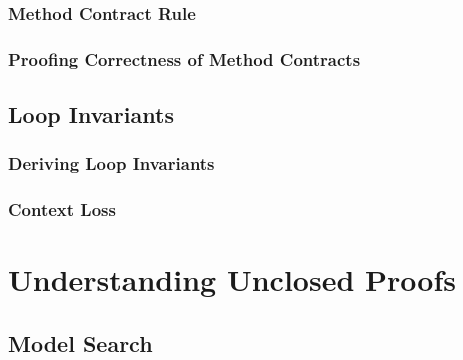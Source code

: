 \documentclass[a4paper, 11pt, accentcolor = tud3b]{tudreport}
\begin{document}
                \subsubsection{Method Contract Rule} %

                \subsubsection{Proofing Correctness of Method Contracts} %

            \subsection{Loop Invariants} %

                \subsubsection{Deriving Loop Invariants} %

                \subsubsection{Context Loss} %

        \section{Understanding Unclosed Proofs} %

            \subsection{Model Search} %
\end{document}
